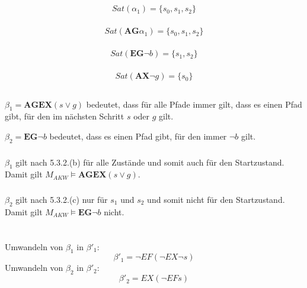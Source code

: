 \documentclass[10pt,a4paper,oneside,ngerman,numbers=noenddot]{scrartcl}
\begin{document}
	\subsection{}
		\subsubsection{}
		\[Sat(\alpha _{1}) = \{s_{0},s_{1},s_{2}\}\]
		\subsubsection{}
		\[Sat(\textbf{AG}\alpha _{1}) = \{s_{0},s_{1},s_{2}\}\]
		\subsubsection{}
		\[Sat(\textbf{EG}\lnot b) = \{s_{1},s_{2}\} \]
		\subsubsection{}
		\[Sat(\textbf{AX}\lnot g) = \{s_{0}\} \]
	\subsection{}
	\(\beta _{1} = \textbf{AGEX}(s \vee g)\) bedeutet, dass für alle Pfade immer gilt, dass es einen Pfad gibt, für den im nächsten Schritt \(s\) oder \(g\) gilt.
	
	\(\beta _{2} = \textbf{EG}\lnot b\) bedeutet, dass es einen Pfad gibt, für den immer \(\lnot b\) gilt.
		
		\subsubsection{}
		\(\beta _{1}\) gilt nach 5.3.2.(b) für alle Zustände und somit auch für den Startzustand. Damit gilt \(M_{AKW} \models \textbf{AGEX}(s \vee g)\).
		\subsubsection{}
		\(\beta _{2}\) gilt nach 5.3.2.(c) nur für \(s_{1}\) und \(s_{2}\) und somit nicht für den Startzustand. Damit gilt \(M_{AKW} \models \textbf{EG}\lnot b\) nicht.
\section{} %
	\subsection{}
	Umwandeln von \(\beta _{1}\) in \(\beta '_{1}\):
	\[\beta '_{1} = \lnot EF(\lnot EX \lnot s)\]
	Umwandeln von \(\beta _{2}\) in \(\beta '_{2}\):
	\[\beta '_{2} = EX(\lnot EF s)\]
	
\end{document}
